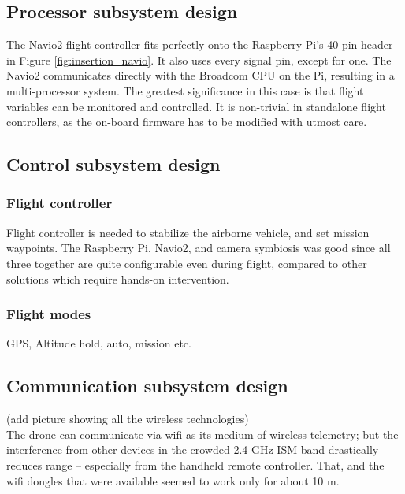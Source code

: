 \subsection{Processor subsystem design}

The Navio2 flight controller fits perfectly onto the Raspberry Pi's 40-pin header in Figure \ref{fig:insertion_navio}. It also uses every signal pin, except for one. The Navio2 communicates directly with the Broadcom CPU on the Pi, resulting in a multi-processor system. The greatest significance in this case is that flight variables can be monitored and controlled. It is non-trivial in standalone flight controllers, as the on-board firmware has to be modified with utmost care.

\subsection{Control subsystem design}

\subsubsection{Flight controller}
Flight controller is needed to stabilize the airborne vehicle, and set mission waypoints. The Raspberry Pi, Navio2, and camera symbiosis was good since all three together are quite configurable even during flight, compared to other solutions which require hands-on intervention.

\subsubsection{Flight modes}

GPS, Altitude hold, auto, mission etc.

\subsection{Communication subsystem design}
\label{sec:comms}

(add picture showing all the wireless technologies)\\

The drone can communicate via wifi as its medium of wireless telemetry; but the interference from other devices in the crowded 2.4 GHz ISM band drastically reduces range -- especially from the handheld remote controller. That, and the wifi dongles that were available seemed to work only for about 10 m.\\

